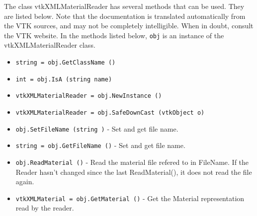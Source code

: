 The class vtkXMLMaterialReader has several methods that can be used.
  They are listed below.
Note that the documentation is translated automatically from the VTK sources,
and may not be completely intelligible.  When in doubt, consult the VTK website.
In the methods listed below, \verb|obj| is an instance of the vtkXMLMaterialReader class.
\begin{itemize}
\item  \verb|string = obj.GetClassName ()|

\item  \verb|int = obj.IsA (string name)|

\item  \verb|vtkXMLMaterialReader = obj.NewInstance ()|

\item  \verb|vtkXMLMaterialReader = obj.SafeDownCast (vtkObject o)|

\item  \verb|obj.SetFileName (string )| -  Set and get file name.

\item  \verb|string = obj.GetFileName ()| -  Set and get file name.

\item  \verb|obj.ReadMaterial ()| -  Read the material file refered to in FileName.
 If the Reader hasn't changed since the last ReadMaterial(),
 it does not read the file again.

\item  \verb|vtkXMLMaterial = obj.GetMaterial ()| -  Get the Material representation read by the reader.

\end{itemize}
